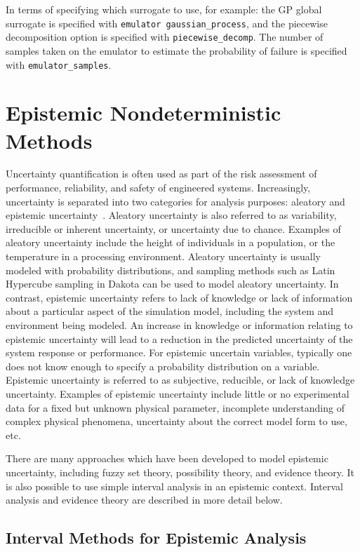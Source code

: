 In terms of specifying which surrogate to use, for example: the GP global surrogate is specified with \texttt{emulator gaussian\_process}, and the piecewise decomposition option is specified with \texttt{piecewise\_decomp}. The number of samples taken on the emulator to estimate the probability of failure is specified with \texttt{emulator\_samples}.

\section{Epistemic Nondeterministic Methods}\label{uq:epistemic}

Uncertainty quantification is often used as part of the risk
assessment of performance, reliability, and safety of engineered
systems. Increasingly, uncertainty is separated into two categories
for analysis purposes: aleatory and epistemic
uncertainty~\cite{Obe03,Hel07}. Aleatory uncertainty is also referred to as
variability, irreducible or inherent uncertainty, or uncertainty due
to chance. Examples of aleatory uncertainty include the height of
individuals in a population, or the temperature in a processing
environment. Aleatory uncertainty is usually modeled with probability
distributions, and sampling methods such as Latin Hypercube sampling
in Dakota can be used to model aleatory uncertainty. In contrast,
epistemic uncertainty refers to lack of knowledge or lack of
information about a particular aspect of the simulation model,
including the system and environment being modeled. An increase in
knowledge or information relating to epistemic uncertainty will lead
to a reduction in the predicted uncertainty of the system response or
performance. For epistemic uncertain variables, typically one does not
know enough to specify a probability distribution on a variable.
Epistemic uncertainty is referred to as subjective, reducible, or lack
of knowledge uncertainty. Examples of epistemic uncertainty include
little or no experimental data for a fixed but unknown physical
parameter, incomplete understanding of complex physical phenomena,
uncertainty about the correct model form to use, etc.

There are many approaches which have been developed to model epistemic
uncertainty, including fuzzy set theory, possibility theory, and
evidence theory. It is also possible to use simple interval analysis in 
an epistemic context. Interval analysis and evidence theory are 
described in more detail below.

\subsection{Interval Methods for Epistemic Analysis}\label{uq:interval}


